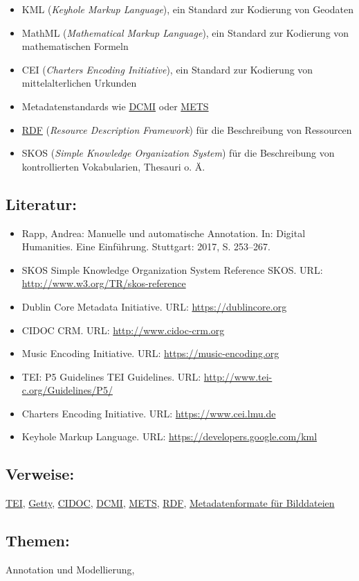 \documentclass{article}
\begin{document}
        \begin{itemize}\item {KML (\emph{Keyhole Markup Language}), ein Standard zur Kodierung von Geodaten}\item {MathML (\emph{Mathematical Markup Language}), ein Standard zur Kodierung  von mathematischen Formeln}\item {CEI (\emph{Charters Encoding Initiative}), ein Standard zur Kodierung von mittelalterlichen Urkunden}\item {Metadatenstandards wie \href{http://gams.uni-graz.at/o:konde.128}{DCMI} oder \href{http://gams.uni-graz.at/o:konde.129}{METS}}\item {\href{http://gams.uni-graz.at/o:konde.131}{RDF} (\emph{Resource Description Framework}) für die Beschreibung von Ressourcen}\item {SKOS (\emph{Simple Knowledge Organization System}) für die Beschreibung von kontrollierten Vokabularien, Thesauri o. Ä.}\end{itemize}\subsection*{Literatur:}\begin{itemize}\item Rapp, Andrea: Manuelle und automatische Annotation. In: Digital Humanities. Eine Einführung. Stuttgart: 2017, S. 253–267.\item SKOS Simple Knowledge Organization System Reference SKOS. URL: \url{http://www.w3.org/TR/skos-reference}\item Dublin Core Metadata Initiative. URL: \url{https://dublincore.org}\item CIDOC CRM. URL: \url{http://www.cidoc-crm.org}\item Music Encoding Initiative. URL: \url{https://music-encoding.org}\item TEI: P5 Guidelines TEI Guidelines. URL: \url{http://www.tei-c.org/Guidelines/P5/}\item Charters Encoding Initiative. URL: \url{https://www.cei.lmu.de}\item Keyhole Markup Language. URL: \url{https://developers.google.com/kml}\end{itemize}\subsection*{Verweise:}\href{https://gams.uni-graz.at/o:konde.178}{TEI}, \href{https://gams.uni-graz.at/o:konde.108}{Getty}, \href{https://gams.uni-graz.at/o:konde.133}{CIDOC}, \href{https://gams.uni-graz.at/o:konde.128}{DCMI}, \href{https://gams.uni-graz.at/o:konde.129}{METS}, \href{https://gams.uni-graz.at/o:konde.131}{RDF}, \href{https://gams.uni-graz.at/o:konde.124}{Metadatenformate für Bilddateien}\subsection*{Themen:}Annotation und Modellierung, 
\end{document}
